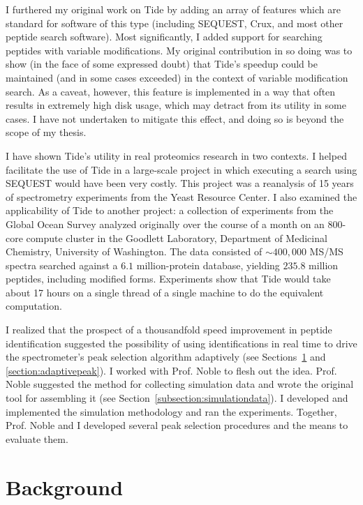 \documentclass[12pt,twoside,openright]{report}
\begin{document}
I furthered my original work on Tide by adding an array of features which are
standard for software of this type (including SEQUEST, Crux, and most other
peptide search software). Most significantly, I added support for searching
peptides with variable modifications. My original contribution in so doing was
to show (in the face of some expressed doubt) that Tide's speedup could be
maintained (and in some cases exceeded) in the context of variable modification
search. As a caveat, however, this feature is implemented in a way that often
results in extremely high disk usage, which may detract from its utility in some
cases. I have not undertaken to mitigate this effect, and doing so is beyond
the scope of my thesis.

I have shown Tide's utility in real proteomics research in two contexts. I
helped facilitate the use of Tide in a large-scale project in which executing a
search using SEQUEST would have been very costly. This project was a reanalysis
of 15 years of spectrometry experiments from the Yeast Resource Center. I also
examined the applicability of Tide to another project: a collection of
experiments from the Global Ocean Survey analyzed originally over the course of
a month on an 800-core compute cluster in the Goodlett Laboratory, Department of
Medicinal Chemistry, University of Washington. The data consisted of $\sim
400,000$ MS/MS spectra searched against a $6.1$ million-protein database,
yielding $235.8$ million peptides, including modified forms. Experiments show that
Tide would take about 17 hours on a single thread of a single machine to do the
equivalent computation.

I realized that the prospect of a thousandfold speed improvement in peptide
identification suggested the possibility of using identifications in real time
to drive the spectrometer's peak selection algorithm adaptively (see
Sections~\ref{section:background} and \ref{section:adaptivepeak}). I
worked with Prof. Noble to flesh out the idea. Prof. Noble suggested the method
for collecting simulation data and wrote the original tool for assembling it
(see Section~\ref{subsection:simulationdata}). I developed and implemented
the simulation methodology and ran the experiments. Together, Prof. Noble and I
developed several peak selection procedures and the means to evaluate them.

\section{Background}
\label{section:background}
\end{document}
